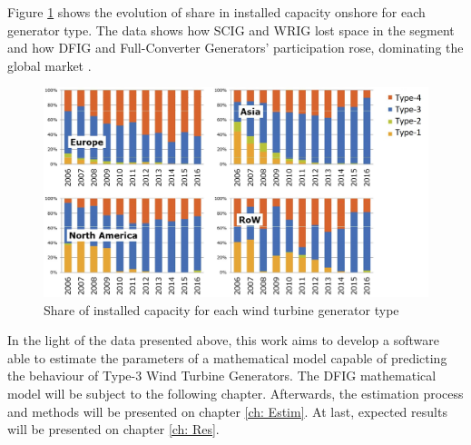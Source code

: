 Figure \ref{fig: WindShare} shows the evolution of share in installed capacity onshore for each generator type. The data shows how SCIG and WRIG lost space in the segment and how DFIG and Full-Converter Generators' participation rose, dominating the global market \cite{Magagna2017}.

\begin{figure}[h]
	\caption{Share of installed capacity for each wind turbine generator type}
	\begin{center}
		\includegraphics[scale=.2]{Images/WTGTypes.jpg}
	\end{center}
	\label{fig: WindShare}
\end{figure}

In the light of the data presented above, this work aims to develop a software able to estimate the parameters of a mathematical model capable of predicting the behaviour of Type-3 Wind Turbine Generators. The DFIG mathematical model will be subject to the following chapter. Afterwards, the estimation process and methods will be presented on chapter \ref{ch: Estim}. At last, expected results will be presented on chapter \ref{ch: Res}.
